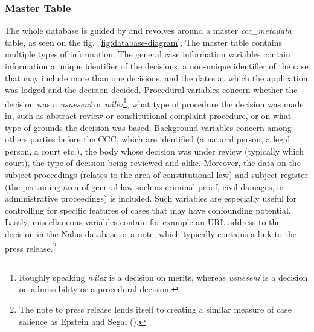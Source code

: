 \documentclass[
  11pt,
]{article}
\begin{document}
\subsubsection{Master Table}\label{master-table}

The whole database is guided by and revolves around a master \emph{ccc\_metadata} table, as seen on the fig.~\ref{fig:database-diagram}. The master table contains multiple types of information. The general case information variables contain information a unique identifier of the decisions, a non-unique identifier of the case that may include more than one decisions, and the dates at which the application was lodged and the decision decided. Procedural variables concern whether the decision was a \emph{usnesení} or \emph{nález}\footnote{Roughly speaking \emph{nález} is a decision on merits, whereas \emph{usnesení} is a decision on admissibility or a procedural decision.}, what type of procedure the decision was made in, such as abstract review or constitutional complaint procedure, or on what type of grounds the decision was based. Background variables concern among others parties before the CCC, which are identified (a natural person, a legal person, a court etc.), the body whose decision was under review (typically which court), the type of decision being reviewed and alike. Moreover, the data on the subject proceedings (relates to the area of constitutional law) and subject register (the pertaining area of general law such as criminal-proof, civil damages, or administrative proceedings) is included. Such variables are especially useful for controlling for specific features of cases that may have confounding potential. Lastly, miscellaneous variables contain for example an URL address to the decision in the Nalus database or a note, which typically contains a link to the press release.\footnote{The note to press release lends itself to creating a similar measure of case salience as Epstein and Segal ().}
\end{document}

